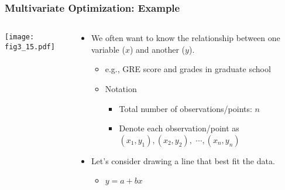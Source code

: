 \documentclass[pdflatex, 12pt]{beamer}
\begin{document}
\begin{frame}
\frametitle{Multivariate Optimization: Example}
\begin{columns}
\begin{column}{0.5\textwidth}
\centering
\texttt{[image: fig3\_15.pdf]}
\end{column}
\begin{column}{0.5\textwidth}
\begin{itemize}
\item We often want to know the relationship between one variable ($x$) and another ($y$).
 \begin{itemize}
 \item e.g., GRE score and grades in graduate school
 \item Notation
  \begin{itemize}
  \item Total number of observations/points: $n$
  \item Denote each observation/point as $(x_1, y_1), (x_2, y_2),$ $\cdots, (x_n, y_n)$
  \end{itemize}
 \end{itemize}
\vspace{0.4cm}
\item Let's consider drawing a line that best fit the data.
 \begin{itemize}
 \item $y = a + bx$
 \end{itemize}
\end{itemize}
\end{column}
\end{columns}
\end{frame}
\end{document}

